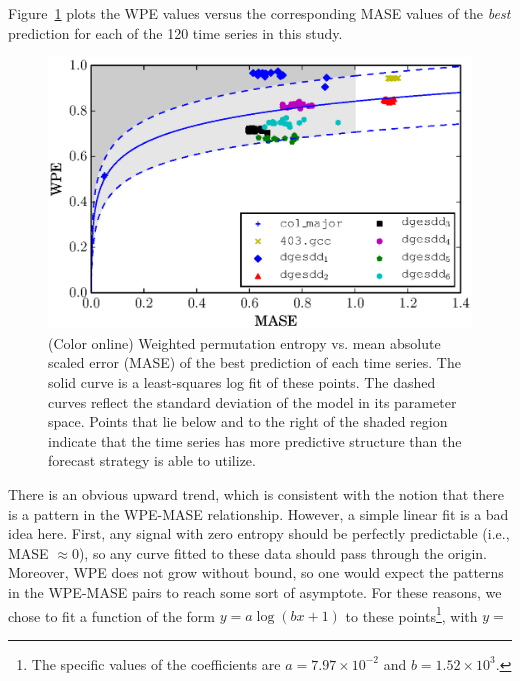 \documentclass[%
pre,
reprint,
superscriptaddress,
showpacs,
nofootinbib,
nobibnotes,
 amsmath,amssymb,
 aps,
]{revtex4-1}
\begin{document}
Figure~\ref{fig:wpe_vs_mase_best} plots the WPE values versus the
corresponding MASE values of the \emph{best} prediction for each of
the 120 time series in this study.
\begin{figure}
  \centering
  \includegraphics[width=1.1\columnwidth]{new_prediction_vs_entropy}
  \caption{(Color online) Weighted permutation entropy vs. mean absolute scaled error
    (MASE) of the best prediction of each time series.  The solid
    curve is a least-squares log fit of these points.
%
%
The dashed curves reflect the standard deviation of the model in its
parameter space.  Points that lie below and to the right of the shaded
region indicate that the time series has more predictive structure
than the forecast strategy is able to utilize.}
  \label{fig:wpe_vs_mase_best}
\end{figure}
%
%
There is an obvious upward trend, which is consistent with the notion
that there is a pattern in the WPE-MASE relationship.  However, a
simple linear fit is a bad idea here.  First, any signal with zero
entropy should be perfectly predictable (i.e., MASE $\approx 0$), so
any curve fitted to these data should pass through the origin.
Moreover, WPE does not grow without bound, so one would expect the
patterns in the WPE-MASE pairs to reach some sort of asymptote.  For
these reasons, we chose to fit a function of the form $y = a \log(b x
+ 1)$ to these points\footnote{The specific values of the coefficients
  are $a=7.97 \times 10^{-2}$ and $b=1.52 \times 10^3$.}, with $y =$
\end{document}
